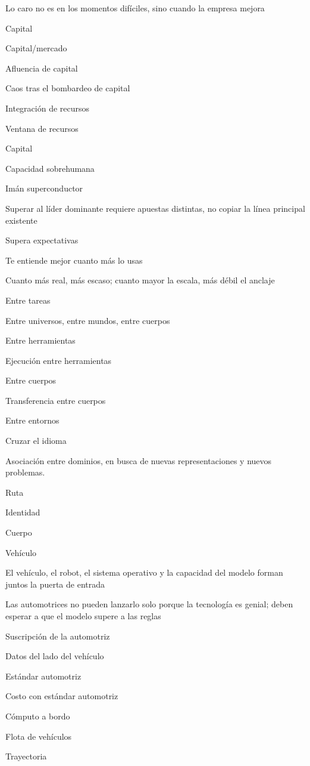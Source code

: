 \documentclass{article}
\begin{document}
Lo caro no es en los momentos difíciles, sino cuando la empresa mejora

Capital

Capital/mercado

Afluencia de capital

Caos tras el bombardeo de capital

Integración de recursos

Ventana de recursos

Capital

Capacidad sobrehumana

Imán superconductor

Superar al líder dominante requiere apuestas distintas, no copiar la línea principal existente

Supera expectativas

Te entiende mejor cuanto más lo usas

Cuanto más real, más escaso; cuanto mayor la escala, más débil el anclaje

Entre tareas

Entre universos, entre mundos, entre cuerpos

Entre herramientas

Ejecución entre herramientas

Entre cuerpos

Transferencia entre cuerpos

Entre entornos

Cruzar el idioma

Asociación entre dominios, en busca de nuevas representaciones y nuevos problemas.

Ruta

Identidad

Cuerpo

Vehículo

El vehículo, el robot, el sistema operativo y la capacidad del modelo forman juntos la puerta de entrada

Las automotrices no pueden lanzarlo solo porque la tecnología es genial; deben esperar a que el modelo supere a las reglas

Suscripción de la automotriz

Datos del lado del vehículo

Estándar automotriz

Costo con estándar automotriz

Cómputo a bordo

Flota de vehículos

Trayectoria
\end{document}
